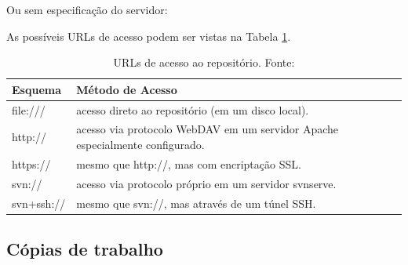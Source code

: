 \begin{multicols}{2}



Ou sem especificação do servidor:

\colorbox{Gray}{
\begin{minipage}{200px}
\end{minipage}
}

\end{multicols}

As possíveis URLs de acesso podem ser vistas na Tabela \ref{tab:urls}.

\begin{table}[!h]
\centering
\caption{URLs de acesso ao repositório. Fonte: \cite{svn-book}}
\label{tab:urls}
\begin{tabular}{|l|l|}
\hline
\rowcolor[HTML]{01796F}
{\color[HTML]{000000} \textbf{Esquema}} & {\color[HTML]{000000} \textbf{Método de Acesso}}                             \\ \hline
file:///                                & acesso direto ao repositório (em um disco local).                            \\ \hline
http://                                 & acesso via protocolo WebDAV em um servidor Apache especialmente configurado. \\ \hline
https://                                & mesmo que http://, mas com encriptação SSL.                                  \\ \hline
svn://                                  & acesso via protocolo próprio em um servidor svnserve.                        \\ \hline
svn+ssh://                              & mesmo que svn://, mas através de um túnel SSH.                               \\ \hline
\end{tabular}
\end{table}



\subsection{Cópias de trabalho}

